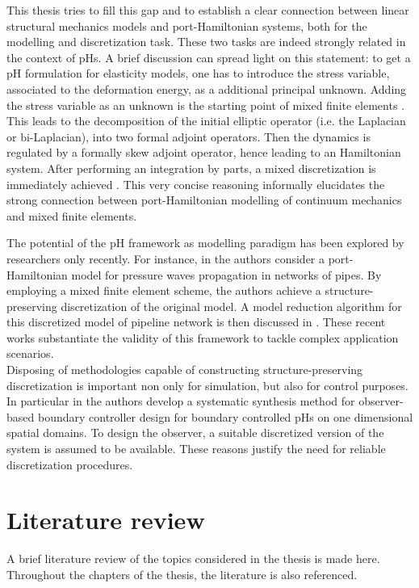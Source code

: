 This thesis tries to fill this gap and to establish a clear connection between linear structural mechanics models and port-Hamiltonian systems, both for the modelling and discretization task. These two tasks are indeed strongly related in the context of pHs. A brief discussion can spread light on this statement: to get a pH formulation for elasticity models, one has to introduce the stress variable, associated to the deformation energy, as a additional principal unknown. Adding the stress variable as an unknown is the starting point of mixed finite elements \cite{arnold1990intro}. This leads to the decomposition of the initial elliptic operator (i.e. the Laplacian or bi-Laplacian), into two formal adjoint operators. Then the dynamics is regulated by a formally skew adjoint operator, hence leading to an Hamiltonian system. After performing an integration by parts, a mixed discretization is immediately achieved \cite{joly2003variational}. This very concise reasoning informally elucidates the strong connection between port-Hamiltonian modelling of continuum mechanics and mixed finite elements. 

The potential of the pH framework as modelling paradigm has been explored by researchers only recently. For instance, in \cite{egger2018damped} the authors consider a port-Hamiltonian model for pressure waves propagation in networks of pipes. By employing a mixed finite element scheme, the authors achieve a structure-preserving discretization of the original model. A model reduction algorithm for this discretized model of pipeline network is then discussed in \cite{egger2018}. These recent works substantiate the validity of this framework to tackle complex application scenarios. \\

Disposing of methodologies capable of constructing structure-preserving discretization is important non only for simulation, but also for control purposes. In particular in \cite{toledo2020} the authors develop a systematic synthesis method for observer-based boundary controller design for boundary controlled pHs on one dimensional spatial domains. To design the observer, a suitable discretized version of the system is assumed to be available. These reasons justify the need for reliable discretization procedures.


\section{Literature review}
A brief literature review of the topics considered in the thesis is made here. Throughout the chapters of the thesis, the literature is also referenced.


